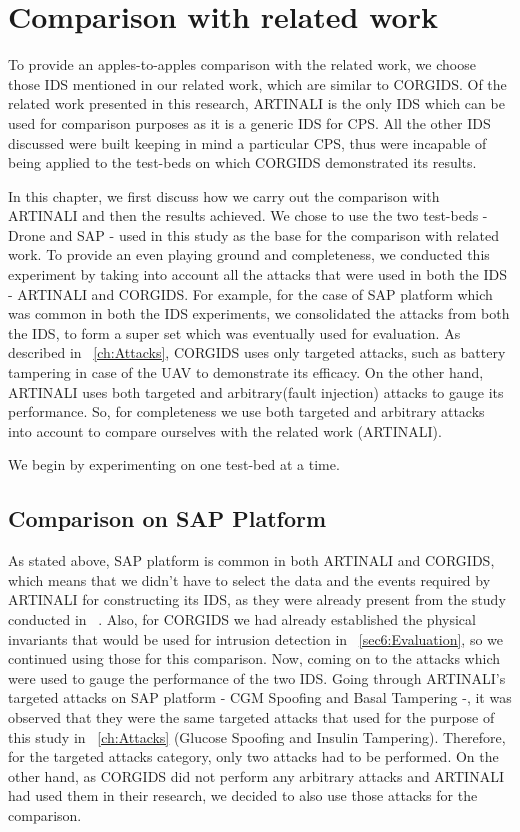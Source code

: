 
\chapter{Comparison with related work}
\label{ch:comparisonwithrelatedwork}

To provide an apples-to-apples comparison with the related work, we choose those IDS mentioned in our related work, which are similar to CORGIDS. Of the related work presented in this research, ARTINALI is the only IDS which can be used for comparison purposes as it is a generic IDS for CPS. All the other IDS discussed were built keeping in mind a particular CPS, thus were incapable of being applied to the test-beds on which CORGIDS demonstrated its results.

In this chapter, we first discuss how we carry out the comparison with ARTINALI and then the results achieved. We chose to use the two test-beds - Drone and SAP - used in this study as the base for the comparison with related work. To provide an even playing ground and completeness, we conducted this experiment by taking into account all the attacks that were used in both the IDS - ARTINALI and CORGIDS. For example, for the case of SAP platform which was common in both the IDS experiments, we consolidated the attacks from both the IDS, to form a super set which was eventually used for evaluation. As described in ~\autoref{ch:Attacks}, CORGIDS uses only targeted attacks, such as battery tampering in case of the UAV to demonstrate its efficacy. On the other hand, ARTINALI uses both targeted and arbitrary(fault injection) attacks to gauge its performance.
So, for completeness we use both targeted and arbitrary attacks into account to compare ourselves with the related work (ARTINALI).

We begin by experimenting on one test-bed at a time.

\section{Comparison on SAP Platform}
As stated above, SAP platform is common in both ARTINALI and CORGIDS, which means that we didn't have to select the data and the events required by ARTINALI for constructing its IDS, as they were already present from the study conducted in ~\cite{aliabadi2017artinali}. Also, for CORGIDS we had already established the physical invariants that would be used for intrusion detection in ~\autoref{sec6:Evaluation}, so we continued using those for this comparison. Now, coming on to the attacks which were used to gauge the performance of the two IDS. Going through ARTINALI's targeted attacks on SAP platform - CGM Spoofing and Basal Tampering -, it was observed that they were the same targeted attacks that used for the purpose of this study in ~\autoref{ch:Attacks} (Glucose Spoofing and Insulin Tampering). Therefore, for the targeted attacks category, only two attacks had to be performed. On the other hand, as CORGIDS did not perform any arbitrary attacks and ARTINALI had used them in their research, we decided to also use those attacks for the comparison.

